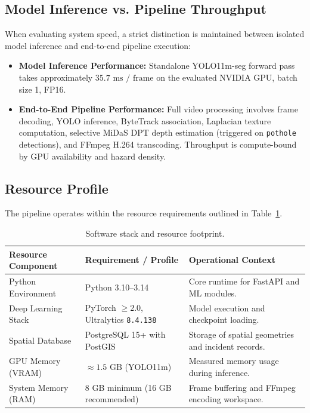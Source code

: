 \documentclass[11pt,a4paper]{article}
\begin{document}
\subsection{Model Inference vs. Pipeline Throughput}
When evaluating system speed, a strict distinction is maintained between isolated model inference and end-to-end pipeline execution:
\begin{itemize}[leftmargin=*]
    \item \textbf{Model Inference Performance:} Standalone YOLO11m-seg forward pass takes approximately $35.7\text{ ms / frame}$ on the evaluated NVIDIA GPU, batch size 1, FP16.
    \item \textbf{End-to-End Pipeline Performance:} Full video processing involves frame decoding, YOLO inference, ByteTrack association, Laplacian texture computation, selective MiDaS DPT depth estimation (triggered on \texttt{pothole} detections), and FFmpeg H.264 transcoding. Throughput is compute-bound by GPU availability and hazard density.
\end{itemize}

\subsection{Resource Profile}
The pipeline operates within the resource requirements outlined in Table~\ref{tab:resource_profile}.

\begin{table}[htbp]
\centering
\small
\caption{Software stack and resource footprint.}
\label{tab:resource_profile}
\begin{tabularx}{\textwidth}{l l X}
\toprule
\textbf{Resource Component} & \textbf{Requirement / Profile} & \textbf{Operational Context} \\
\midrule
Python Environment & Python 3.10--3.14 & Core runtime for FastAPI and ML modules. \\
Deep Learning Stack & PyTorch $\ge 2.0$, Ultralytics \texttt{8.4.138} & Model execution and checkpoint loading. \\
Spatial Database & PostgreSQL 15+ with PostGIS & Storage of spatial geometries and incident records. \\
GPU Memory (VRAM) & $\approx 1.5\text{ GB}$ (YOLO11m) & Measured memory usage during inference. \\
System Memory (RAM) & 8 GB minimum (16 GB recommended) & Frame buffering and FFmpeg encoding workspace. \\
\bottomrule
\end{tabularx}
\end{table}
\end{document}
